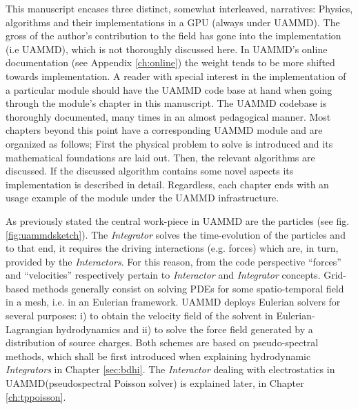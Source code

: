 \documentclass[ twoside,openright,titlepage,numbers=noenddot,%
headinclude,footinclude,cleardoublepage=empty,abstract=on,
BCOR=5mm,paper=a4,fontsize=11pt, dvipsnames
]{scrreprt}
\newcommand{\uammd}{\gls{UAMMD}\xspace}
\begin{document}
This manuscript encases three distinct, somewhat interleaved, narratives: Physics, algorithms and their implementations in a GPU (always under UAMMD).
The gross of the author's contribution to the field has gone into the implementation (i.e UAMMD), which is not thoroughly discussed here. In UAMMD's online documentation (see Appendix \ref{ch:online}) the weight tends to be more shifted towards implementation. A reader with special interest in the implementation of a particular module should have the UAMMD code base at hand when going through the module's chapter in this manuscript. The UAMMD codebase is thoroughly documented, many times in an almost pedagogical manner.
Most chapters beyond this point have a corresponding UAMMD module and are organized as follows; First the physical problem to solve is introduced and its mathematical foundations are laid out. Then, the relevant algorithms are discussed. If the discussed algorithm contains some novel aspects its implementation is described in detail. Regardless, each chapter ends with an usage example of the module under the UAMMD infrastructure.


As previously stated the central work-piece in \uammd are the particles (see fig. \ref{fig:uammdsketch}). The \emph{Integrator} solves the time-evolution of the particles and to that end, it requires the driving interactions (e.g. forces) which are, in turn, provided by the \emph{Interactors}. For this reason, from the code perspective ``forces'' and ``velocities'' respectively pertain to \emph{Interactor} and \emph{Integrator} concepts. Grid-based methods generally consist on solving \glspl{PDE} for some spatio-temporal field in a mesh, i.e. in an Eulerian framework. \uammd deploys Eulerian solvers for several purposes: i) to obtain the velocity field of the solvent in Eulerian-Lagrangian hydrodynamics and ii) to solve the force field generated by a distribution of source charges. Both schemes are based on pseudo-spectral methods, which shall be first introduced when explaining hydrodynamic \emph{Integrators} in Chapter \ref{sec:bdhi}. The \emph{Interactor} dealing with electrostatics in \uammd (pseudospectral Poisson solver) is explained later, in Chapter \ref{ch:tppoisson}.
\end{document}
